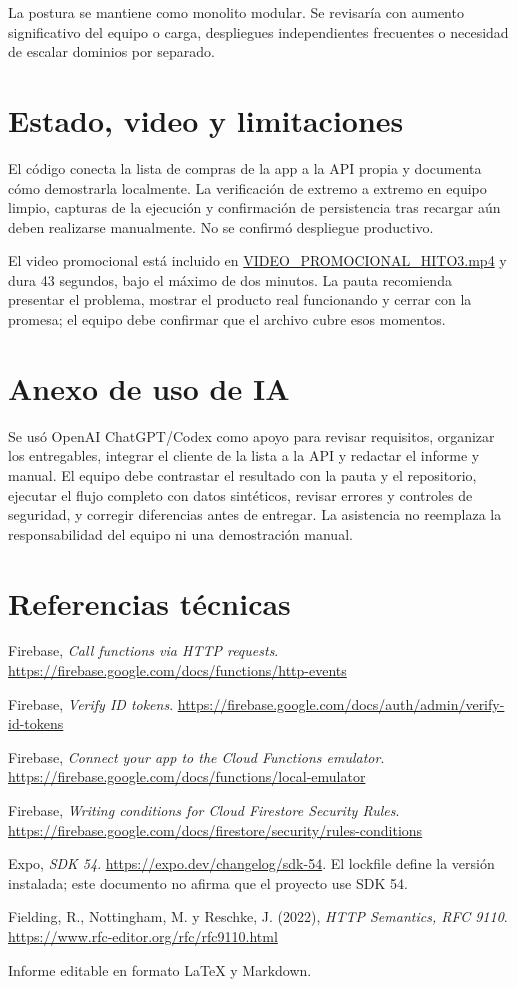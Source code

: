 \documentclass[11pt,a4paper]{article}
\begin{document}
La postura se mantiene como monolito modular. Se revisaría con aumento significativo del equipo o carga, despliegues independientes frecuentes o necesidad de escalar dominios por separado.

\section{Estado, video y limitaciones}
El código conecta la lista de compras de la app a la API propia y documenta cómo demostrarla localmente. La verificación de extremo a extremo en equipo limpio, capturas de la ejecución y confirmación de persistencia tras recargar aún deben realizarse manualmente. No se confirmó despliegue productivo.

El video promocional está incluido en \href{VIDEO_PROMOCIONAL_HITO3.mp4}{VIDEO\_PROMOCIONAL\_HITO3.mp4} y dura 43 segundos, bajo el máximo de dos minutos. La pauta recomienda presentar el problema, mostrar el producto real funcionando y cerrar con la promesa; el equipo debe confirmar que el archivo cubre esos momentos.

\section{Anexo de uso de IA}
Se usó OpenAI ChatGPT/Codex como apoyo para revisar requisitos, organizar los entregables, integrar el cliente de la lista a la API y redactar el informe y manual. El equipo debe contrastar el resultado con la pauta y el repositorio, ejecutar el flujo completo con datos sintéticos, revisar errores y controles de seguridad, y corregir diferencias antes de entregar. La asistencia no reemplaza la responsabilidad del equipo ni una demostración manual.

\section{Referencias técnicas}
\begin{enumerate}[label={[\arabic*]},leftmargin=2.1em,itemsep=3pt]
\item Firebase, \emph{Call functions via HTTP requests}. \url{https://firebase.google.com/docs/functions/http-events}
\item Firebase, \emph{Verify ID tokens}. \url{https://firebase.google.com/docs/auth/admin/verify-id-tokens}
\item Firebase, \emph{Connect your app to the Cloud Functions emulator}. \url{https://firebase.google.com/docs/functions/local-emulator}
\item Firebase, \emph{Writing conditions for Cloud Firestore Security Rules}. \url{https://firebase.google.com/docs/firestore/security/rules-conditions}
\item Expo, \emph{SDK 54}. \url{https://expo.dev/changelog/sdk-54}. El lockfile define la versión instalada; este documento no afirma que el proyecto use SDK 54.
\item Fielding, R., Nottingham, M. y Reschke, J. (2022), \emph{HTTP Semantics, RFC 9110}. \url{https://www.rfc-editor.org/rfc/rfc9110.html}
\end{enumerate}

\vfill\small\color{gris}Informe editable en formato LaTeX y Markdown.
\end{document}
